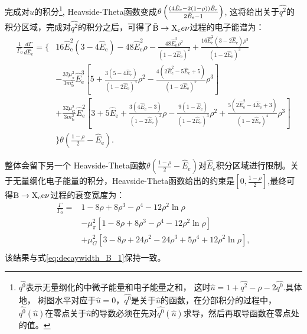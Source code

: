 完成对$\hat{u}$的积分\footnote{$\hat{q^{0}}$表示无量纲化的中微子能量和电子能量之和， 这时$\hat{u}=1+\hat{q^{2}}-\rho-2\hat{q^{0}}$.具体地， 树图水平对应于$\hat{u}=0$，$\hat{q^{0}}$是关于$\hat{u}$的函数，在分部积分的过程中，$\hat{q^{0}}(\hat{u})$在零点关于$\hat{u}$的导数必须在先对$\hat{q^{0}}(\hat{u})$求导，然后再取导函数在零点处的值。}, Heavside-Theta函数变成$\theta\left(\frac{(4 \hat{E}_{\mathrm{e}} - 2 (1 - \rho)) \hat{E}_{\mathrm{e}}}{2 \hat{E}_{\mathrm{e}} - 1}\right)$, 这将给出关于$\hat{q^{2}}$的积分区域，完成对$\hat{q^{2}}$的积分之后，可得了$\mathrm{\bar{B}}\to \mathrm{X_{c}}e\nu$过程的电子能谱为：
\begin{equation}
    \begin{aligned}
        \frac{1}{\Gamma_{0}} \frac{d \Gamma}{d \hat{E}_{\mathrm{e}}} = \{ & 16 \hat{E}_{\mathrm{e}}^2 (3 - 4 \hat{E}_{\mathrm{e}}) - 48 \hat{E}_{\mathrm{e}}^2 \rho - \frac{48 \hat{E}_{\mathrm{e}}^2 \rho^2}{(1 - 2 \hat{E}_{\mathrm{e}})^2} + \frac{16 \hat{E}_{\mathrm{e}}^2 (3 - 2 \hat{E}_{\mathrm{e}}) \rho^3}{(1 - 2 \hat{E}_{\mathrm{e}})^3} \\
        & - \frac{32 \mu_{\pi}^2}{3 m_{\mathrm{b}}^2} \hat{E}_{\mathrm{e}}^3 \left[ 5 + \frac{3 (5 - 4 \hat{E}_{\mathrm{e}})}{(1 - 2 \hat{E}_{\mathrm{e}})^4} \rho^2 - \frac{4 (2 \hat{E}_{\mathrm{e}}^2 - 5 \hat{E}_{\mathrm{e}} + 5)}{(1 - 2 \hat{E}_{\mathrm{e}})^5} \rho^3 \right] \\
        & + \frac{32 \mu_{\mathrm{G}}^2}{3 m_{\mathrm{b}}^2} \hat{E}_{\mathrm{e}}^2 \left[ 3 + 5 \hat{E}_{\mathrm{e}} + \frac{3 (4 \hat{E}_{\mathrm{e}} - 3)}{(1 - 2 \hat{E}_{\mathrm{e}})^2} \rho - \frac{9 (1 - \hat{E}_{\mathrm{e}})}{(1 - 2 \hat{E}_{\mathrm{e}})^3} \rho^2 + \frac{5 (2 \hat{E}_{\mathrm{e}}^2 - 4 \hat{E}_{\mathrm{e}} + 3)}{(1 - 2 \hat{E}_{\mathrm{e}})^4} \rho^3 \right] \\
        & \} \theta \left( \frac{1 - \rho}{2} - \hat{E}_{\mathrm{e}} \right).
    \end{aligned}
\end{equation}

整体会留下另一个 Heavside-Theta函数$\theta(\frac{1-\rho}{2}-\hat{E}_{e})$对$\hat{E}_{e}$积分区域进行限制。关于无量纲化电子能量的积分，Heavside-Theta函数给出的约束是$\left[0,\frac{1-\rho}{2}\right]$,最终可得$\mathrm{B\to X_{c} e\nu}$过程的衰变宽度为：
\begin{equation}
    \begin{aligned}
    \frac{\Gamma}{\Gamma_{0}}=&1 - 8 \rho + 8 \rho^3 - \rho^4 - 12 \rho^2 \ln\rho\\
    &-\mu_{\pi}^2\left[1 - 8 \rho + 8 \rho^3 - \rho^4 - 12 \rho^2 \ln\rho\right]\\
    &+\mu_{G}^2\left[3 - 8 \rho + 24 \rho^2 - 24 \rho^3 + 5 \rho^4 + 12 \rho^2 \ln\rho\right],\\
\end{aligned}
\end{equation}
该结果与式\eqref{eq:decaywidth_B_1}保持一致。
